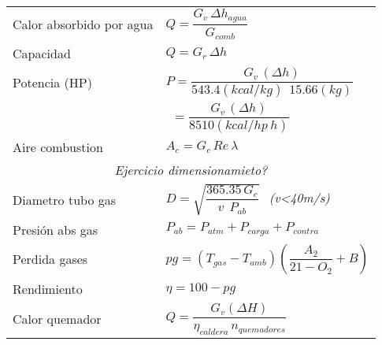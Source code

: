 \documentclass[11pt,a4paper]{article}
\begin{document}
\begin{cajita}
\begin{multicols}{2}
			\renewcommand{\arraystretch}{1.5}
		
			\begin{tabular}{p{} l}
				Calor absorbido por agua & $Q=\dfrac{G_v\,\Delta h_{agua}}{G_{comb}}$\\
				Capacidad  & $Q=G_{r} \, \Delta h$\\
				Potencia  (HP) & $P=\dfrac{G_{v}\,\left(\Delta h\right)}{543.4(kcal/kg)~~15.66(kg)}~~$\\
				&$~~=\dfrac{G_{v}\,\left(\Delta h\right)}{8510 (kcal/hp~h)}$\\[0.4cm]
				Aire combustion& $A_{c}=G_{c}\,Re\,\lambda$\\
				\multicolumn{2}{c}{\textsl{Ejercicio dimensionamieto?}}\\
				Diametro tubo gas & $D=\sqrt{\dfrac{365.35\,G_{c}}{v~~P_{ab}}}~~$ \textit{(v<40m/s)}\\
				Presión abs gas& $P_{ab}=P_{atm}+P_{carga}+P_{contra}$\\
				Perdida gases & $pg=(T_{gas}-T_{amb})\left(\dfrac{A_{2}}{21-O_{2}}+B\right)$\\
				Rendimiento  & $ \eta=100-pg$\\
				Calor quemador& $Q=\dfrac{G_{v}(\Delta H)}{\eta_{caldera} \, n_{quemadores}}$\\
			\end{tabular}
		\end{multicols}
	\end{cajita}
\newpage
\end{document}
